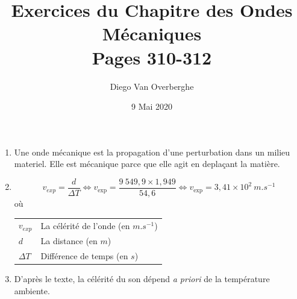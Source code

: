 \documentclass[12pt, a4paper]{article}
\makeatletter
\newenvironment{conditions}
  {\par\vspace{\abovedisplayskip}\noindent\begin{tabular}{>{$}l<{$} @{${\quad}={\quad}$} l}}
  {\end{tabular}\par\vspace{\belowdisplayskip}}
\makeatother
\begin{document}
    
    \title{Exercices du Chapitre des Ondes Mécaniques \\ \Large{Pages 310-312}}
    \author{Diego Van Overberghe}
    \date{9 Mai 2020}
    \maketitle

    \begin{Exercise}[number={24}]
        \begin{enumerate}[1.]
            \item Une onde mécanique est la propagation d'une perturbation dans un milieu materiel. Elle est mécanique parce que elle agit en deplaçant la matière.
        \item   \begin{equation*}
                    v_{exp}=\frac{d}{\Delta T}
                    \iff v_\text{exp}=\frac{9\ 549{,}9\times 1{,}949}{54{,}6}
                    \iff v_\text{exp}=3{,}41\times 10^2\ \si{m.s^{-1}}
                \end{equation*} où
                \begin{conditions}
                    v_{exp}  & La célérité de l'onde (en $\si{m.s^{-1}}$) \\
                    d        & La distance (en $\si{m}$) \\
                    \Delta T & Différence de temps (en $\si{s}$)
                \end{conditions}

        \item D'après le texte, la célérité du son dépend \textit{a priori} de la température ambiente.                
        \end{enumerate}
    \end{Exercise}
\end{document}
